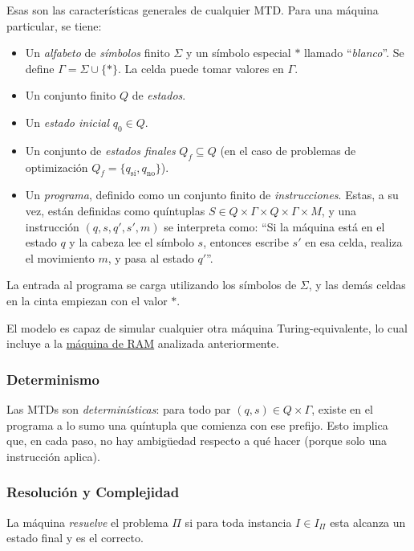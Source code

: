 \documentclass[a4paper]{report}
\begin{document}
Esas son las características generales de cualquier MTD. Para una máquina particular, se tiene:
\begin{itemize}
    \item Un \textit{alfabeto} de \textit{símbolos} finito $\Sigma$ y un símbolo especial $\ast$ llamado ``\textit{blanco}''. Se define $\Gamma = \Sigma \cup \{\ast\}$. La celda puede tomar valores en $\Gamma$.
    \item Un conjunto finito $Q$ de \textit{estados}.
    \item Un \textit{estado inicial} $q_0 \in Q$.
    \item Un conjunto de \textit{estados finales} $Q_f \subseteq Q$ (en el caso de problemas de optimización $Q_f = \{q_{\text{sí}}, q_{\text{no}}\}$).
    \item Un \textit{programa}, definido como un conjunto finito de \textit{instrucciones}. Estas, a su vez, están definidas como quíntuplas $S \in Q \times \Gamma \times Q \times \Gamma \times M$, y una instrucción $(q, s, q', s', m)$ se interpreta como: ``Si la máquina está en el estado $q$ y la cabeza lee el símbolo $s$, entonces escribe $s'$ en esa celda, realiza el movimiento $m$, y pasa al estado $q'$''.
\end{itemize}

La entrada al programa se carga utilizando los símbolos de $\Sigma$, y las demás celdas en la cinta empiezan con el valor $\ast$.

El modelo es capaz de simular cualquier otra máquina Turing-equivalente, lo cual incluye a la \hyperref[maquina-ram]{máquina de RAM} analizada anteriormente.

\subsubsection{Determinismo}

Las MTDs son \textit{determinísticas}: para todo par $(q, s) \in Q \times \Gamma$, existe en el programa a lo sumo una quíntupla que comienza con ese prefijo. Esto implica que, en cada paso, no hay ambigüedad respecto a qué hacer (porque solo una instrucción aplica).

\subsubsection{Resolución y Complejidad}

La máquina \textit{resuelve} el problema $\Pi$ si para toda instancia $I \in I_{\Pi}$ esta alcanza un estado final y es el correcto.
\end{document}
